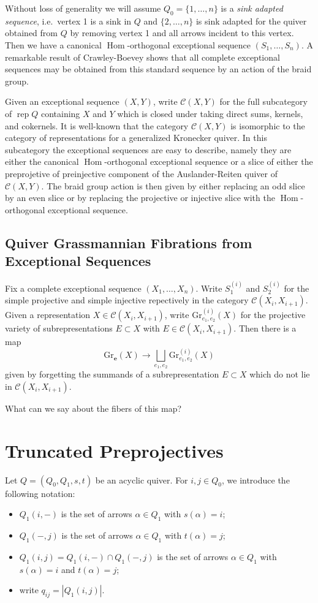 \documentclass{amsart}
\numberwithin{equation}{section}
\newcommand{\bfe}{\mathbf{e}}
\newcommand{\cC}{\mathcal{C}}
\newcommand{\Gr}{\mathrm{Gr}}
\newcommand{\Hom}{\operatorname{Hom}}
\newcommand{\rep}{\operatorname{rep}}
\begin{document}
Without loss of generality we will assume $Q_0=\{1,\ldots,n\}$ is a \emph{sink adapted sequence}, i.e.\ vertex 1 is a sink in $Q$ and $\{2,\ldots,n\}$ is sink adapted for the quiver obtained from $Q$ by removing vertex 1 and all arrows incident to this vertex.
Then we have a canonical $\Hom$-orthogonal exceptional sequence $(S_1,\ldots,S_n)$.
A remarkable result of Crawley-Boevey shows that all complete exceptional sequences may be obtained from this standard sequence by an action of the braid group.

Given an exceptional sequence $(X,Y)$, write $\cC(X,Y)$ for the full subcategory of $\rep Q$ containing $X$ and $Y$ which is closed under taking direct sums, kernels, and cokernels.
It is well-known \cite{???} that the category $\cC(X,Y)$ is isomorphic to the category of representations for a generalized Kronecker quiver.
In this subcategory the exceptional sequences are easy to describe, namely they are either the canonical $\Hom$-orthogonal exceptional sequence or a slice of either the preprojetive of preinjective component of the Auslander-Reiten quiver of $\cC(X,Y)$.
The braid group action is then given by either replacing an odd slice by an even slice or by replacing the projective or injective slice with the $\Hom$-orthogonal exceptional sequence.


\subsection{Quiver Grassmannian Fibrations from Exceptional Sequences}

Fix a complete exceptional sequence $(X_1,\ldots,X_n)$.
Write $S_1^{(i)}$ and $S_2^{(i)}$ for the simple projective and simple injective repectively in the category $\cC(X_i,X_{i+1})$.
Given a representation $X\in\cC(X_i,X_{i+1})$, write $\Gr^{(i)}_{e_1,e_2}(X)$ for the projective variety of subrepresentations $E\subset X$ with $E\in\cC(X_i,X_{i+1})$.
Then there is a map
\[\Gr_\bfe(X)\to\bigsqcup_{e_1,e_2} \Gr^{(i)}_{e_1,e_2}(X)\]
given by forgetting the summands of a subrepresentation $E\subset X$ which do not lie in $\cC(X_i,X_{i+1})$.

What can we say about the fibers of this map?

\section{Truncated Preprojectives}

Let $Q=(Q_0,Q_1,s,t)$ be an acyclic quiver.
For $i,j\in Q_0$, we introduce the following notation:
\begin{itemize}
  \item $Q_1(i,-)$ is the set of arrows $\alpha\in Q_1$ with $s(\alpha)=i$;
  \item $Q_1(-,j)$ is the set of arrows $\alpha\in Q_1$ with $t(\alpha)=j$;
  \item $Q_1(i,j)=Q_1(i,-)\cap Q_1(-,j)$ is the set of arrows $\alpha\in Q_1$ with $s(\alpha)=i$ and $t(\alpha)=j$;
  \item write $q_{ij}=|Q_1(i,j)|$.
\end{itemize}
\end{document}
